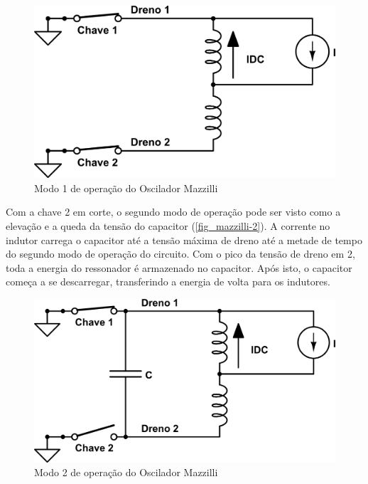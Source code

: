 \begin{figure}[htb]
\caption{\label{fig_mazzilli-1}Modo 1 de operação do Oscilador Mazzilli}
\begin{center}
\includegraphics[scale=0.3]{images/mazzilli-1.png}
\end{center}
\end{figure}

Com a chave 2 em corte, o segundo modo de operação pode ser visto como a elevação e a queda da tensão do capacitor (\autoref{fig_mazzilli-2}). A corrente no indutor carrega o capacitor até a tensão máxima de dreno até a metade de tempo do segundo modo de operação do circuito. Com o pico da tensão de dreno em 2, toda a energia do ressonador é armazenado no capacitor. Após isto, o capacitor começa a se descarregar, transferindo a energia de volta para os indutores. 

\begin{figure}[h!tb]
\caption{\label{fig_mazzilli-2}Modo 2 de operação do Oscilador Mazzilli}
\begin{center}
\includegraphics[scale=0.3]{images/mazzilli-2.png}
\end{center}
\end{figure}

